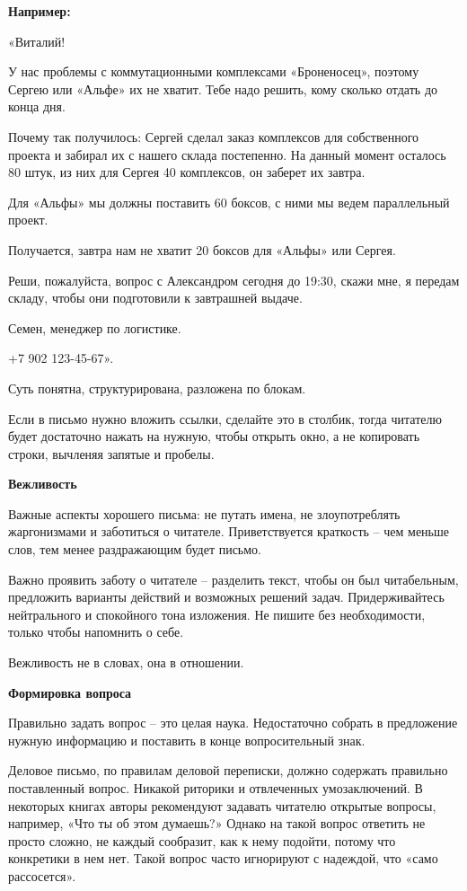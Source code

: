 \textbf{Например:}

«Виталий!

У нас проблемы с коммутационными комплексами «Броненосец», поэтому Сергею или «Альфе» их не хватит. Тебе надо решить, кому сколько отдать до конца дня.

Почему так получилось: Сергей сделал заказ комплексов для собственного проекта и забирал их с нашего склада постепенно. На данный момент осталось 80 штук, из них для Сергея 40 комплексов, он заберет их завтра.

Для «Альфы» мы должны поставить 60 боксов, с ними мы ведем параллельный проект.

Получается, завтра нам не хватит 20 боксов для «Альфы» или Сергея.

Реши, пожалуйста, вопрос с Александром сегодня до 19:30, скажи мне, я передам складу, чтобы они подготовили к завтрашней выдаче.

Семен, менеджер по логистике.

+7 902 123-45-67».

Суть понятна, структурирована, разложена по блокам.

Если в письмо нужно вложить ссылки, сделайте это в столбик, тогда читателю будет достаточно нажать на нужную, чтобы открыть окно, а не копировать строки, вычленяя запятые и пробелы.

\textbf{Вежливость}

Важные аспекты хорошего письма: не путать имена, не злоупотреблять жаргонизмами и заботиться о читателе. Приветствуется краткость – чем меньше слов, тем менее раздражающим будет письмо.

Важно проявить заботу о читателе – разделить текст, чтобы он был читабельным, предложить варианты действий и возможных решений задач. Придерживайтесь нейтрального и спокойного тона изложения. Не пишите без необходимости, только чтобы напомнить о себе.

Вежливость не в словах, она в отношении.

\textbf{Формировка вопроса}

Правильно задать вопрос – это целая наука. Недостаточно собрать в предложение нужную информацию и поставить в конце вопросительный знак.

Деловое письмо, по правилам деловой переписки, должно содержать правильно поставленный вопрос. Никакой риторики и отвлеченных умозаключений. В некоторых книгах авторы рекомендуют задавать читателю открытые вопросы, например, «Что ты об этом думаешь?» Однако на такой вопрос ответить не просто сложно, не каждый сообразит, как к нему подойти, потому что конкретики в нем нет. Такой вопрос часто игнорируют с надеждой, что «само рассосется».

